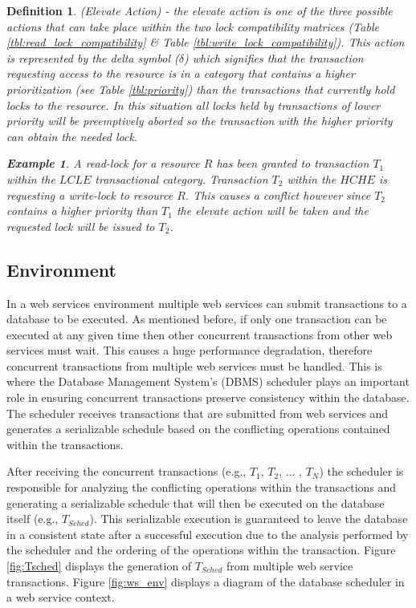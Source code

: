 \documentclass[conference]{IEEEtran}
\newtheorem{definition}{Definition}
\newtheorem{example}{Example}[definition]
\begin{document}
\begin{definition}
\label{elevate_action}
 (Elevate Action) - the elevate action is one of the three possible actions that can take place within the two lock compatibility matrices (Table \ref{tbl:read_lock_compatibility} \& Table \ref{tbl:write_lock_compatibility}). This action is represented by the delta symbol ($\delta$) which signifies that the transaction requesting access to the resource is in a category that contains a higher prioritization (see Table \ref{tbl:priority}) than the transactions that currently hold locks to the resource. In this situation all locks held by transactions of lower priority will be preemptively aborted so the transaction with the higher priority can obtain the needed lock.
 
 \begin{example}
 \label{ex_elevate_action}
  A read-lock for a resource $R$ has been granted to transaction $T_{1}$ within the $LCLE$ transactional category. Transaction $T_{2}$ within the $HCHE$ is requesting a write-lock to resource $R$. This causes a conflict however since $T_{2}$ contains a higher priority than $T_{1}$ the elevate action will be taken and the requested lock will be issued to $T_{2}$.
 \end{example}
 
\end{definition}

\subsection{Environment}
In a web services environment multiple web services can submit transactions to a database to be executed. As mentioned before, if only one transaction can be executed at any given time then other concurrent transactions from other web services must wait. This causes a huge performance degradation, therefore concurrent transactions from multiple web services must be handled. This is where the Database Management System's (DBMS) scheduler plays an important role in ensuring concurrent transactions preserve consistency within the database. The scheduler receives transactions that are submitted from web services and generates a serializable schedule based on the conflicting operations contained within the transactions. 

After receiving the concurrent transactions (e.g., $T_{1}$, $T_{2}$, ... , $T_{N}$) the scheduler is responsible for analyzing the conflicting operations within the transactions and generating a serializable schedule that will then be executed on the database itself (e.g., $T_{Sched}$). This serializable execution is guaranteed to leave the database in a consistent state after a successful execution due to the analysis performed by the scheduler and the ordering of the operations within the transaction. Figure \ref{fig:Tsched} displays the generation of $T_{Sched}$ from multiple web service transactions. Figure \ref{fig:ws_env} displays a diagram of the database scheduler in a web service context.
\end{document}
